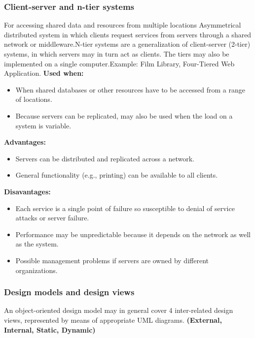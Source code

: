 \documentclass[../ESOF_notes.tex]{subfiles}
\begin{document}
\subsubsection{Client-server and n-tier systems}
For accessing shared data and resources from multiple locations \newline \newline
Asymmetrical distributed system in which clients request services from servers through a shared network or middleware.\newline N-tier systems are a generalization of client-server (2-tier) systems, in which servers may in turn act as clients. The tiers may also be implemented on a single computer.\newline Example: Film Library, Four-Tiered Web Application.\newline\newline
\textbf{Used when:}
\begin{itemize}
    \item When shared databases or other resources have to be accessed from a range of locations.
    \item Because servers can be replicated, may also be used when the load on a system is variable.
\end{itemize}
\textbf{Advantages:}
\begin{itemize}
    \item Servers can be distributed and replicated across a network.
    \item General functionality (e.g., printing) can be available to all clients.
\end{itemize}
\textbf{Disavantages:}
\begin{itemize}
    \item Each service is a single point of failure so susceptible to denial of service attacks or server failure.
    \item Performance may be unpredictable because it depends on the network as well as the system.
    \item Possible management problems if servers are owned by different organizations.
\end{itemize}

\subsubsection{Design models and design views}
An object-oriented design model may in general cover 4 inter-related design views, represented by means of appropriate UML diagrams. \textbf{(External, Internal, Static, Dynamic)}
\end{document}
